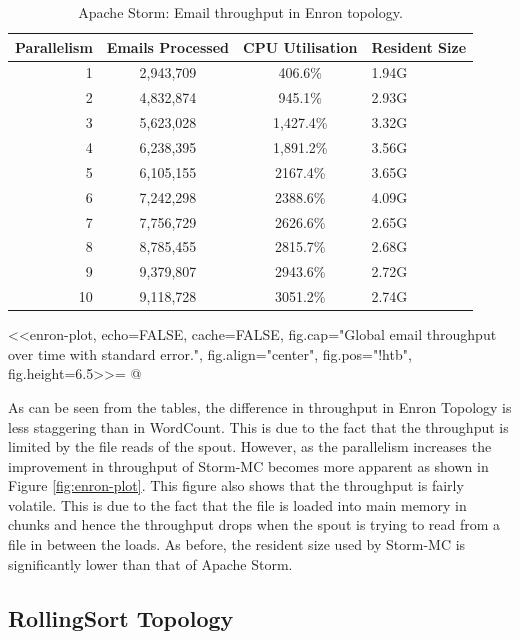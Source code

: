 \begin{table}[!htb]
\begin{adjustwidth}{-0.5in}{-0.5in}
\centering
\small
\begin{tabular}{@{}rccl@{}}
    \textbf{Parallelism} & \textbf{Emails Processed} & \textbf{CPU Utilisation} & \textbf{Resident Size} \\ \toprule
    1 & {2,943,709} & {406.6\%} & {1.94G} \\
    2 & {4,832,874} & {945.1\%} & {2.93G} \\
    3 & {5,623,028} & {1,427.4\%} & {3.32G} \\
    4 & {6,238,395} & {1,891.2\%} & {3.56G} \\
    5 & {6,105,155} & {2167.4\%} & {3.65G} \\
    6 & {7,242,298} & {2388.6\%} & {4.09G} \\
    7 & {7,756,729} & {2626.6\%} & {2.65G} \\
    8 & {8,785,455} & {2815.7\%} & {2.68G} \\
    9 & {9,379,807} & {2943.6\%} & {2.72G} \\
    10 & {9,118,728} & {3051.2\%} & {2.74G} \\
\end{tabular}
\caption{Apache Storm: Email throughput in Enron topology.}
\label{table:storm_enron}
\end{adjustwidth}
\end{table}

<<enron-plot, echo=FALSE, cache=FALSE, fig.cap="Global email throughput over time with standard error.", fig.align="center", fig.pos="!htb", fig.height=6.5>>=
@

As can be seen from the tables, the difference in throughput in Enron Topology is less staggering than in WordCount. This is due to the fact that the throughput is limited by the file reads of the spout. However, as the parallelism increases the improvement in throughput of Storm-MC becomes more apparent as shown in Figure \ref{fig:enron-plot}. This figure also shows that the throughput is fairly volatile. This is due to the fact that the file is loaded into main memory in chunks and hence the throughput drops when the spout is trying to read from a file in between the loads. As before, the resident size used by Storm-MC is significantly lower than that of Apache Storm.

\subsection{RollingSort Topology}

